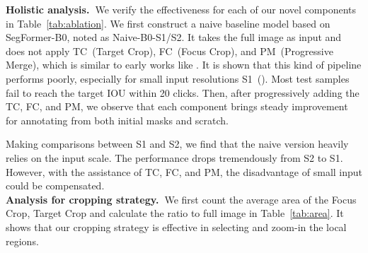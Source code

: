 \documentclass[10pt,twocolumn,letterpaper]{article}
\begin{document}
\noindent \textbf{Holistic analysis.~}We verify the effectiveness for each of our novel components in Table~\ref{tab:ablation}.  We first construct a naive baseline model based on SegFormer-B0, noted as Naive-B0-S1/S2. It takes the full image as input and does not apply TC~(Target Crop), FC~(Focus Crop), and PM~(Progressive Merge), which is similar to early works like \cite{xu2016deep,jang2019brs,li2018latentdiversity}.  It is shown that this kind of pipeline performs poorly, especially for small input resolutions S1~(). Most test samples fail to reach the target IOU within 20 clicks.  Then, after progressively adding the TC, FC, and PM, we observe that each component brings steady improvement for annotating from both initial masks and scratch. 

Making comparisons between S1 and S2, we find that the naive version heavily relies on the input scale. The performance drops tremendously from S2 to S1. However, with the assistance of TC, FC, and PM, the disadvantage of small input could be compensated. \\


\noindent \textbf{Analysis for cropping strategy.~}We first count the average area of the Focus Crop, Target Crop and calculate the ratio to full image in Table~\ref{tab:area}. It shows that our cropping strategy is effective in selecting and zoom-in the local regions.


\begin{table}[t]
\small
\begin{center}
\end{center}
\vspace{-5mm}
\caption{ Statistics for the area of Focus Crop and Target Crop. We report the ratio relative to the full scale image.
}
\vspace{-2mm} \label{tab:area}
\end{table}
\end{document}
